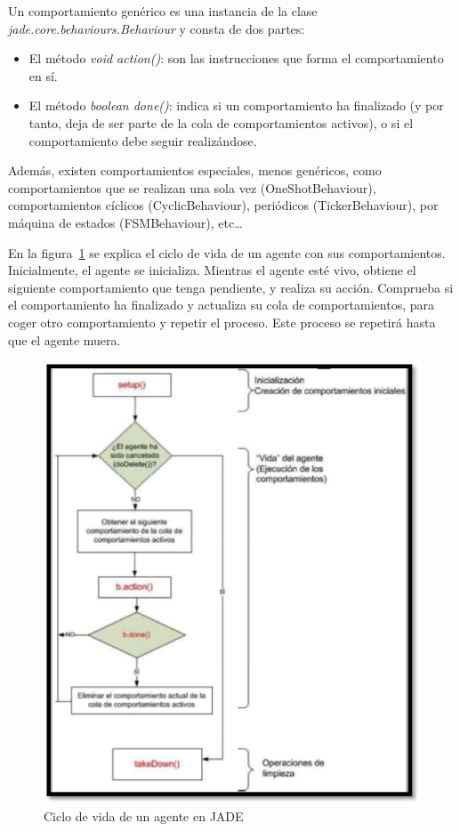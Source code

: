 Un comportamiento genérico es una instancia de la clase \emph{jade.core.behaviours.\-Behaviour} y consta de dos partes:
\begin{itemize}
\item El método \emph{void action()}: son las instrucciones que forma el comportamiento en sí.
\item El método \emph{boolean done()}: indica si un comportamiento ha finalizado (y por tanto, deja de ser parte de la cola de comportamientos activos), o si el comportamiento debe seguir realizándose.
\end{itemize}

Además, existen comportamientos especiales, menos genéricos, como comportamientos que se realizan una sola vez (OneShotBehaviour), comportamientos cíclicos (CyclicBehaviour), periódicos (TickerBehaviour), por máquina de estados (FSMBehaviour), etc…

En la figura~\ref{fig:cicloVidaJade} se explica el ciclo de vida de un agente con sus comportamientos. Inicialmente, el agente se inicializa. Mientras el agente esté vivo, obtiene el siguiente comportamiento que tenga pendiente, y realiza su acción. Comprueba si el comportamiento ha finalizado y actualiza su cola de comportamientos, para coger otro comportamiento y repetir el proceso. Este proceso se repetirá hasta que el agente muera.

\begin{figure}[t]
\centering
\includegraphics[scale=0.75]{img/6/cicloVidaJade}
\caption{Ciclo de vida de un agente en JADE
\label{fig:cicloVidaJade}}
\end{figure}



